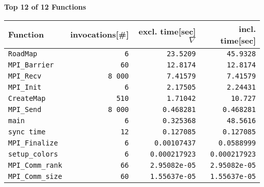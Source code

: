 \documentclass[a4paper,10pt]{article}
\begin{document}
\newpage

\begin{center}\small
{\Large \bf Top 12 of 12 Functions}
\bigskip
\begin{longtable}{|l||r|r|r|}

   \hline
   \bf Function & \bf invocations[\#] & \bf excl. time[sec] $\nabla$ & \bf incl. time[sec] \\
   \hline\hline
  \verb|RoadMap| &   \verb|6| &   \verb|23.5209| &   \verb|45.9328| \\
  \verb|MPI_Barrier| &   \verb|60| &   \verb|12.8174| &   \verb|12.8174| \\
  \verb|MPI_Recv| &   \verb|8 000| &   \verb|7.41579| &   \verb|7.41579| \\
      \hline
  \verb|MPI_Init| &   \verb|6| &   \verb|2.17505| &   \verb|2.24431| \\
  \verb|CreateMap| &   \verb|510| &   \verb|1.71042| &   \verb|10.727| \\
  \verb|MPI_Send| &   \verb|8 000| &   \verb|0.468281| &   \verb|0.468281| \\
      \hline
  \verb|main| &   \verb|6| &   \verb|0.325368| &   \verb|48.5616| \\
  \verb|sync time| &   \verb|12| &   \verb|0.127085| &   \verb|0.127085| \\
  \verb|MPI_Finalize| &   \verb|6| &   \verb|0.00107437| &   \verb|0.0588999| \\
      \hline
  \verb|setup_colors| &   \verb|6| &   \verb|0.000217923| &   \verb|0.000217923| \\
  \verb|MPI_Comm_rank| &   \verb|66| &   \verb|2.95082e-05| &   \verb|2.95082e-05| \\
  \verb|MPI_Comm_size| &   \verb|60| &   \verb|1.55637e-05| &   \verb|1.55637e-05| \\
   \hline
\end{longtable}

\end{center}
\newpage
\end{document}
